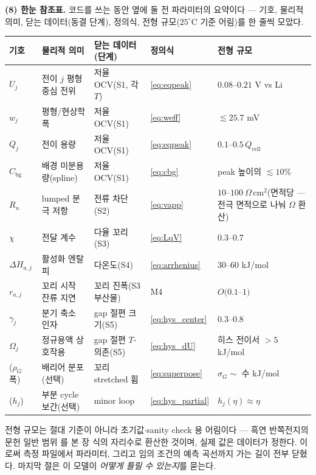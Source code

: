 \documentclass[11pt,a4paper]{article}
\newcommand{\cell}{\mathrm{cell}}
\newcommand{\bg}{\mathrm{bg}}
\begin{document}
\textbf{(8) 한눈 참조표.} 코드를 쓰는 동안 옆에 둘 전 파라미터의 요약이다 — 기호, 물리적 의미, 닫는
데이터(동결 단계), 정의식, 전형 규모($25^\circ$C 기준 어림)를 한 줄씩 모았다.
\begin{center}
\renewcommand{\arraystretch}{1.3}
\begin{tabular}{p{} p{} p{} p{} p{}}
\toprule
기호 & 물리적 의미 & 닫는 데이터(단계) & 정의식 & 전형 규모 \\
\midrule
$U_j$ & 전이 $j$ 평형 중심 전위 & 저율 OCV(S1, 각 $T$) & \eqref{eq:eqpeak} & $0.08$--$0.21$ V vs Li \\
$w_j$ & 평형/현상학 폭 & 저율 OCV(S1) & \eqref{eq:weff} & $\lesssim25.7$ mV \\
$Q_j$ & 전이 용량 & 저율 OCV(S1) & \eqref{eq:eqpeak} & $0.1$--$0.5\,Q_\cell$ \\
$C_\bg$ & 배경 미분용량(spline) & 저율 OCV(S1) & \eqref{eq:cbg} & peak 높이의 $\lesssim10\%$ \\
$R_n$ & lumped 분극 저항 & 전류 차단(S2) & \eqref{eq:vapp} & $10$--$100\ \Omega\,$cm$^2$(면적당 — 전극 면적으로 나눠 $\Omega$ 환산) \\
$\chi$ & 전달 계수 & 다율 꼬리(S3) & \eqref{eq:LqV} & $0.3$--$0.7$ \\
$\Delta H_{a,j}$ & 활성화 엔탈피 & 다온도(S4) & \eqref{eq:arrhenius} & $30$--$60$ kJ/mol \\
$r_{a,j}$ & 꼬리 시작 잔류 지연 & 꼬리 진폭(S3 부산물) & M4 & $O(0.1$--$1)$ \\
$\gamma_j$ & 분기 축소 인자 & gap 절편 크기(S5) & \eqref{eq:hys_center} & $0.3$--$0.8$ \\
$\Omega_j$ & 정규용액 상호작용 & gap 절편 $T$-의존(S5) & \eqref{eq:hys_dU} & 히스 전이서 $>5$ kJ/mol \\
($\rho_G$ 폭) & 배리어 분포(선택) & 꼬리 stretched 휨 & \eqref{eq:superpose} & $\sigma_G\sim$ 수 kJ/mol \\
($h_j$) & 부분 cycle 보간(선택) & minor loop & \eqref{eq:hys_partial} & $h_j(\eta)\approx\eta$ \\
\bottomrule
\end{tabular}
\end{center}
전형 규모는 절대 기준이 아니라 초기값$\cdot$sanity check 용 어림이다 — 흑연 반쪽전지의 문헌 일반 범위
\cite{dahn1991,reynier2004,weppner1977}를 본 장 식의 자리수로 환산한 것이며, 실제 값은 데이터가 정한다. 이로써 측정 파일에서 파라미터, 그리고 임의 조건의 예측 곡선까지
가는 길이 전부 닫혔다. 마지막 절은 이 모델이 \emph{어떻게 틀릴 수 있는지}를 묻는다.
\end{document}

